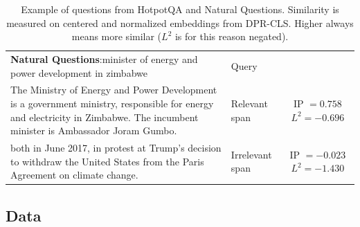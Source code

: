 \begin{table}
\begin{tabular}{p{7.5cm}lc}
        \midrule
        \textbf{Natural Questions}:\newline minister of energy and power development in zimbabwe                  & Query                                                   \\
        \cmidrule{2-3}
        The Ministry of Energy and Power Development is a government ministry, responsible for energy and electricity in Zimbabwe. The incumbent minister is Ambassador Joram Gumbo.
                                                                                                                  & Relevant span
                                                                                                                  & \makecell[tl]{IP $= 0.758$                              \\ $L^2 = -0.696$} \\
        both in June 2017, in protest at Trump's decision to withdraw the United States from the Paris Agreement on climate change.
                                                                                                                  & Irrelevant span
                                                                                                                  & \makecell[tl]{IP $= -0.023$                             \\ $L^2 = -1.430$} \\
        \bottomrule
    \end{tabular}
    \caption{Example of questions from HotpotQA and Natural Questions. Similarity is measured on centered and normalized embeddings from DPR-CLS. Higher always means more similar ($L^2$ is for this reason negated).}
    \label{tab:dataset_example}
\end{table}


\subsection{Data} \label{subsec:model_and_data}

